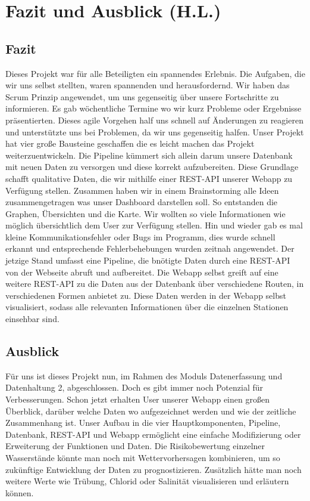\section{Fazit und Ausblick (H.L.)}
\label{sec-Fazit und Ausblick}

\subsection{Fazit}

Dieses Projekt war für alle Beteiligten ein spannendes Erlebnis. Die Aufgaben, die wir uns selbst stellten, waren spannenden
und herausfordernd. Wir haben das Scrum Prinzip angewendet, um uns gegenseitig über unsere Fortschritte zu informieren. Es gab wöchentliche Termine wo wir kurz Probleme oder Ergebnisse präsentierten. Dieses agile Vorgehen half uns schnell auf Änderungen zu reagieren und 
unterstützte uns bei Problemen, da wir uns gegenseitig halfen. Unser Projekt hat vier große Bausteine geschaffen die es leicht machen das Projekt
weiterzuentwickeln. Die Pipeline kümmert sich allein darum unsere Datenbank mit neuen Daten zu versorgen und diese korrekt aufzubereiten.
Diese Grundlage schafft qualitative Daten, die wir mithilfe einer REST-API unserer Webapp zu Verfügung stellen.
Zusammen haben wir in einem Brainstorming alle Ideen zusammengetragen was unser Dashboard darstellen soll. So entstanden die Graphen, Übersichten und die Karte. 
Wir wollten so viele Informationen wie möglich übersichtlich dem User zur Verfügung stellen.
Hin und wieder gab es mal kleine Kommunikationsfehler oder Bugs im Programm, dies wurde schnell erkannt und entsprechende Fehlerbehebungen wurden zeitnah 
angewendet.
Der jetzige Stand umfasst eine Pipeline, die bnötigte Daten durch eine REST-API von der Webseite abruft und aufbereitet. Die Webapp selbst greift auf eine weitere REST-API zu die Daten aus der Datenbank über verschiedene Routen, in verschiedenen Formen anbietet zu.
Diese Daten werden in der Webapp selbst visualisiert, sodass alle relevanten Informationen über die einzelnen Stationen einsehbar sind.


\subsection{Ausblick}

Für uns ist dieses Projekt nun, im Rahmen des Moduls Datenerfassung und Datenhaltung 2, abgeschlossen. Doch es gibt immer noch
Potenzial für Verbesserungen. Schon jetzt erhalten User unserer Webapp einen großen Überblick, darüber welche Daten wo aufgezeichnet werden 
und wie der zeitliche Zusammenhang ist. Unser Aufbau in die vier Hauptkomponenten, Pipeline, Datenbank, REST-API und Webapp ermöglicht
eine einfache Modifizierung oder Erweiterung der Funktionen und Daten. Die Risikobewertung einzelner Wasserstände könnte man noch mit Wettervorhersagen 
kombinieren, um so zukünftige Entwicklung der Daten zu prognostizieren.
 Zusätzlich hätte man noch weitere Werte wie Trübung, Chlorid oder Salinität visualisieren und erläutern können. 
